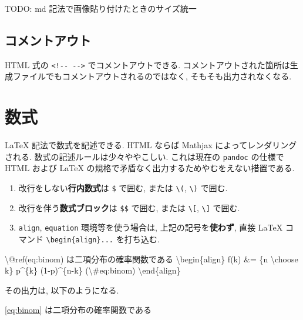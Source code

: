 \documentclass[
]{bxjsbook}
\newenvironment{Shaded}{\begin{snugshade}}{\end{snugshade}}
\newcommand{\NormalTok}[1]{#1}
\newcommand{\SpecialCharTok}[1]{\textcolor[rgb]{0.00,0.00,0.00}{#1}}
\providecommand{\tightlist}{%
  \setlength{\itemsep}{0pt}\setlength{\parskip}{0pt}}
\theoremstyle{definition}
\theoremstyle{definition}
\theoremstyle{definition}
\theoremstyle{remark}
\begin{document}
TODO: md 記法で画像貼り付けたときのサイズ統一

\hypertarget{ux30b3ux30e1ux30f3ux30c8ux30a2ux30a6ux30c8}{%
\subsection{コメントアウト}\label{ux30b3ux30e1ux30f3ux30c8ux30a2ux30a6ux30c8}}

HTML 式の \texttt{\textless{}!-\/-\ -\/-\textgreater{}}
でコメントアウトできる.
コメントアウトされた箇所は生成ファイルでもコメントアウトされるのではなく,
そもそも出力されなくなる.

\hypertarget{ux6570ux5f0f}{%
\section{数式}\label{ux6570ux5f0f}}

LaTeX 記法で数式を記述できる. HTML ならば Mathjax
によってレンダリングされる. 数式の記述ルールは少々ややこしい.
これは現在の \texttt{pandoc} の仕様で HTML および LaTeX
の規格で矛盾なく出力するためやむをえない措置である.

\begin{enumerate}
\def\labelenumi{\arabic{enumi}.}
\tightlist
\item
  改行をしない\textbf{行内数式}は \texttt{\$} で囲む, または
  \texttt{\textbackslash{}(}, \texttt{\textbackslash{})} で囲む.
\item
  改行を伴う\textbf{数式ブロック}は \texttt{\$\$} で囲む, または
  \texttt{\textbackslash{}{[}}, \texttt{\textbackslash{}{]}} で囲む.
\item
  \texttt{align}, \texttt{equation} 環境等を使う場合は,
  上記の記号を\textbf{使わず}, 直接 LaTeX コマンド
  \texttt{\textbackslash{}begin\{align\}...} を打ち込む.
\end{enumerate}

\begin{Shaded}
\begin{Highlighting}[]
\NormalTok{\textbackslash{}@ref(eq:binom) は二項分布の確率関数である}
\NormalTok{\textbackslash{}begin\{align\}}
\NormalTok{f(k) \&= \{n \textbackslash{}choose k\} p\^{}\{k\} (1{-}p)\^{}\{n{-}k\} (}\SpecialCharTok{\textbackslash{}\#}\NormalTok{eq:binom)}
\NormalTok{\textbackslash{}end\{align\}}
\end{Highlighting}
\end{Shaded}

その出力は, 以下のようになる.

\eqref{eq:binom} は二項分布の確率関数である
\end{document}
